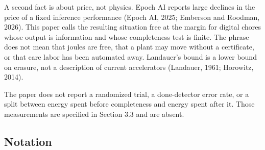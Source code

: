\documentclass[
  10pt,
]{article}
\begin{document}
A second fact is about price, not physics. Epoch AI reports large
declines in the price of a fixed inference performance (Epoch AI, 2025;
Emberson and Roodman, 2026). This paper calls the resulting situation
free at the margin for digital chores whose output is information and
whose completeness test is finite. The phrase does not mean that joules
are free, that a plant may move without a certificate, or that care
labor has been automated away. Landauer's bound is a lower bound on
erasure, not a description of current accelerators (Landauer, 1961;
Horowitz, 2014).

The paper does not report a randomized trial, a done-detector error
rate, or a split between energy spent before completeness and energy
spent after it. Those measurements are specified in Section 3.3 and are
absent.

\subsection{Notation}\label{notation}
\end{document}
